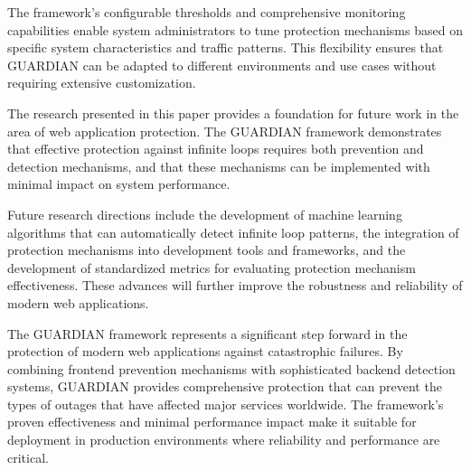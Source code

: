 \documentclass[10pt]{article}
\begin{document}
The framework's configurable thresholds and comprehensive monitoring capabilities enable system administrators to tune protection mechanisms based on specific system characteristics and traffic patterns. This flexibility ensures that GUARDIAN can be adapted to different environments and use cases without requiring extensive customization.

The research presented in this paper provides a foundation for future work in the area of web application protection. The GUARDIAN framework demonstrates that effective protection against infinite loops requires both prevention and detection mechanisms, and that these mechanisms can be implemented with minimal impact on system performance.

Future research directions include the development of machine learning algorithms that can automatically detect infinite loop patterns, the integration of protection mechanisms into development tools and frameworks, and the development of standardized metrics for evaluating protection mechanism effectiveness. These advances will further improve the robustness and reliability of modern web applications.

The GUARDIAN framework represents a significant step forward in the protection of modern web applications against catastrophic failures. By combining frontend prevention mechanisms with sophisticated backend detection systems, GUARDIAN provides comprehensive protection that can prevent the types of outages that have affected major services worldwide. The framework's proven effectiveness and minimal performance impact make it suitable for deployment in production environments where reliability and performance are critical.
\end{document}

